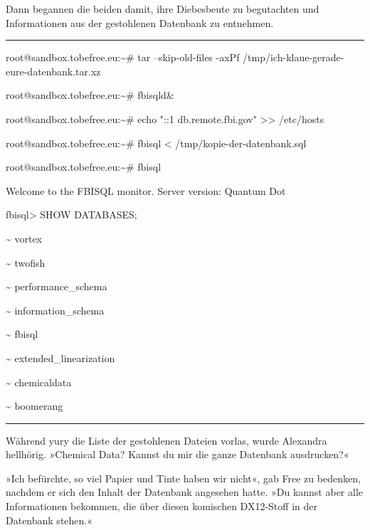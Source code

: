 Dann begannen die beiden damit, ihre Diebesbeute zu begutachten und Informationen aus der gestohlenen Datenbank zu entnehmen.

\noindent \parbox{\textwidth}{ \vspace{3ex} \hrule \vspace{3ex}

    \begin{footnotesize}
    \begin{ttfamily}

\noindent root@sandbox.tobefree.eu:\textasciitilde{}\# tar --skip-old-files -axPf /tmp/ich-klaue-gerade-eure-datenbank.tar.xz

\noindent root@sandbox.tobefree.eu:\textasciitilde{}\# fbisqld\&

\noindent root@sandbox.tobefree.eu:\textasciitilde{}\# echo "::1 db.remote.fbi.gov" >> /etc/hosts

\noindent  root@sandbox.tobefree.eu:\textasciitilde{}\# fbisql < /tmp/kopie-der-datenbank.sql

\noindent root@sandbox.tobefree.eu:\textasciitilde{}\# fbisql

\noindent Welcome to the FBISQL monitor. Server version: Quantum Dot

\noindent fbisql> SHOW DATABASES;

\noindent \textasciitilde{} vortex

\noindent \textasciitilde{} twofish

\noindent \textasciitilde{} performance\_schema

\noindent \textasciitilde{} information\_schema

\noindent \textasciitilde{} fbisql

\noindent \textasciitilde{} extended\_linearization

\noindent \textasciitilde{} chemicaldata

\noindent \textasciitilde{} boomerang

    \end{ttfamily}
    \end{footnotesize}

\vspace{3ex} \hrule \vspace{3ex} }

Während yury die Liste der gestohlenen Dateien vorlas, wurde Alexandra hellhörig. »Chemical Data? Kannst du mir die ganze Datenbank ausdrucken?«

»Ich befürchte, so viel Papier und Tinte haben wir nicht«, gab Free zu bedenken, nachdem er sich den Inhalt der Datenbank angesehen hatte. »Du kannst aber alle Informationen bekommen, die über diesen komischen DX12-Stoff in der Datenbank stehen.«

